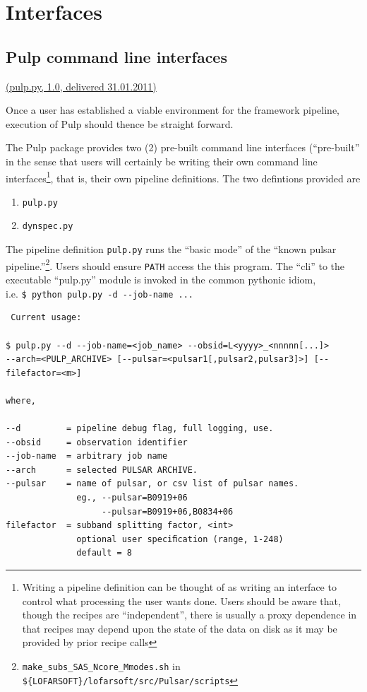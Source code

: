 \documentclass[a4paper,10pt,bibtotoc]{scrartcl}
\begin{document}
\section{Interfaces}
\label{sec:interfaces}
\subsection{Pulp command line interfaces}

\underline{(pulp.py, 1.0, delivered 31.01.2011)}

Once a user has established a viable environment for the framework pipeline, execution of Pulp should thence be straight forward.

The Pulp package provides two (2) pre-built command line interfaces
(``pre-built'' in the sense that users will certainly be writing their
own command line interfaces\footnote{Writing a
pipeline definition can be thought of as writing an interface to
control what processing the user wants done. Users should be
aware that, though the recipes are ``independent'', there is usually a
proxy dependence in that recipes may depend upon the
state of the data on disk as it may be provided by prior recipe calls}, that is,
their own pipeline definitions. The two defintions provided are
\begin{enumerate}
\item \verb|pulp.py|
\item \verb|dynspec.py|
\end{enumerate}

The pipeline definition \verb|pulp.py| runs the ``basic mode'' of the
``known pulsar pipeline.''\footnote{ \texttt{make\_subs\_SAS\_Ncore\_Mmodes.sh} in
\texttt{\$\{LOFARSOFT\}/lofarsoft/src/Pulsar/scripts}}. Users should
ensure \verb|PATH| access the this program. The ``cli'' to the
executable ``pulp.py'' module is invoked in the common pythonic idiom,\\

 i.e. \verb|$ python pulp.py -d --job-name ...|\\
\begin{verbatim}
 Current usage:

$ pulp.py --d --job-name=<job_name> --obsid=L<yyyy>_<nnnnn[...]>
--arch=<PULP_ARCHIVE> [--pulsar=<pulsar1[,pulsar2,pulsar3]>] [--filefactor=<m>]

where,

--d         = pipeline debug flag, full logging, use.
--obsid     = observation identifier          
--job-name  = arbitrary job name             
--arch      = selected PULSAR ARCHIVE.
--pulsar    = name of pulsar, or csv list of pulsar names.
              eg., --pulsar=B0919+06
                   --pulsar=B0919+06,B0834+06
filefactor  = subband splitting factor, <int>
              optional user speciﬁcation (range, 1-248)
              default = 8
\end{verbatim}
\end{document}
